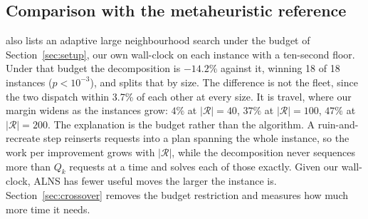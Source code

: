 \subsection{Comparison with the metaheuristic reference}

 also lists an adaptive large neighbourhood search under the
budget of Section~\ref{sec:setup}, our own wall-clock on each instance with a
ten-second floor. Under that budget
the decomposition is $-14.2\%$ against it, winning 18 of
18 instances ($p<10^{-3}$), and  splits that by
size. The difference is not the fleet, since the two dispatch within
3.7\% of each other at every size. It is travel, where our margin
widens as the instances grow: $4\%$ at $|\mathcal{R}|=40$, $37\%$ at $|\mathcal{R}|=100$, $47\%$ at $|\mathcal{R}|=200$.
The explanation is the budget rather than the algorithm. A ruin-and-recreate
step reinserts requests into a plan spanning the whole instance, so the work per
improvement grows with $|\mathcal{R}|$, while the decomposition never sequences
more than $Q_k$ requests at a time and solves each of those exactly. Given our
wall-clock, ALNS has fewer useful moves the larger the instance is.
Section~\ref{sec:crossover} removes the budget restriction and measures how
much more time it needs.

